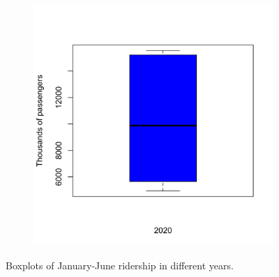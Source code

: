 \documentclass[letterpaper, 10 pt, conference]{article}
\begin{document}
\begin{figure}[h!]
\begin{subfigure}[b]{0.3\linewidth}
		\caption{}
	\end{subfigure}
	\begin{subfigure}[b]{0.3\linewidth}
		\includegraphics[width=\linewidth]{boxplot_2020.png}
		\caption{}
	\end{subfigure}
	\caption{Boxplots of January-June ridership in different years.}
	\label{fig:boxplots}
\end{figure}
\end{document}
